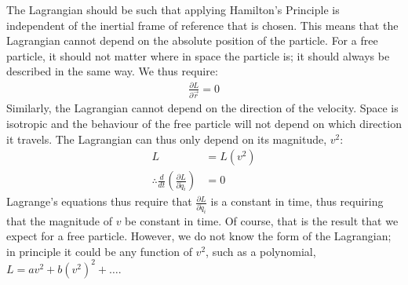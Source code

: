 The Lagrangian should be such that applying Hamilton's Principle is independent of the inertial frame of reference that is chosen. This means that the Lagrangian cannot depend on the absolute position of the particle. For a free particle, it should not matter where in space the particle is; it should always be described in the same way. We thus require:
\begin{align}
\frac{\partial L}{\partial \vec{r}}=0
\end{align}
Similarly, the Lagrangian cannot depend on the direction of the velocity. Space is isotropic and the behaviour of the free particle will not depend on which direction it travels. The Lagrangian can thus only depend on its magnitude, $v^2$:
\begin{align}
L&=L(v^2)\\
\therefore \frac{d}{dt}\left(\frac{\partial L}{\partial \dot{q}_i} \right)&=0
\end{align}
Lagrange's equations thus require that $\frac{\partial L}{\partial \dot{q}_i}$ is a constant in time, thus requiring that the magnitude of $v$ be constant in time. Of course, that is the result that we expect for a free particle. However, we do not know the form of the Lagrangian; in principle it could be any function of $v^2$, such as a polynomial, $L=av^2+b(v^2)^2+\dots$.

